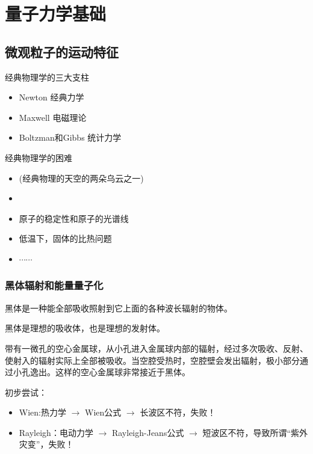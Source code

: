 \chapter{量子力学基础}

\section{微观粒子的运动特征}
经典物理学的三大支柱
\begin{itemize}
\item Newton 经典力学
\item Maxwell 电磁理论
\item Boltzman和Gibbs 统计力学
\end{itemize}

经典物理学的困难
\begin{itemize}
\item {}(经典物理的天空的两朵乌云之一)
\item {}
\item 原子的稳定性和原子的光谱线
\item 低温下，固体的比热问题
\item $\cdots \cdots$
\end{itemize}


\subsection{黑体辐射和能量量子化}

\begin{defT}[黑体]
黑体是一种能全部吸收照射到它上面的各种波长辐射的物体。
\end{defT}
黑体是理想的吸收体，也是理想的发射体。

\begin{exT}
带有一微孔的空心金属球，从小孔进入金属球内部的辐射，经过多次吸收、反射、使射入的辐射实际上全部被吸收。当空腔受热时，空腔壁会发出辐射，极小部分通过小孔逸出。这样的空心金属球非常接近于黑体。
\end{exT}

初步尝试：
\begin{itemize}
\item Wien:热力学 $\rightarrow$ Wien公式 $\rightarrow$ 长波区不符，失败！
\item Rayleigh：电动力学 $\rightarrow$ Rayleigh-Jeans公式 $\rightarrow$ 短波区不符，导致所谓“紫外灾变”，失败！
\end{itemize}

